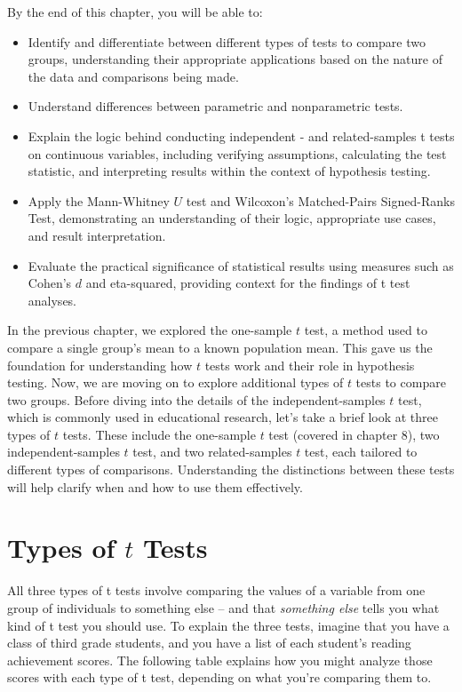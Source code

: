 \documentclass[
  letterpaper,
  DIV=11,
  numbers=noendperiod]{scrreprt}
\begin{document}

By the end of this chapter, you will be able to:

\begin{itemize}
\item
  Identify and differentiate between different types of tests to compare
  two groups, understanding their appropriate applications based on the
  nature of the data and comparisons being made.
\item
  Understand differences between parametric and nonparametric tests.
\item
  Explain the logic behind conducting independent - and related-samples
  t tests on continuous variables, including verifying assumptions,
  calculating the test statistic, and interpreting results within the
  context of hypothesis testing.
\item
  Apply the Mann-Whitney \(U\) test and Wilcoxon's Matched-Pairs
  Signed-Ranks Test, demonstrating an understanding of their logic,
  appropriate use cases, and result interpretation.
\item
  Evaluate the practical significance of statistical results using
  measures such as Cohen's \(d\) and eta-squared, providing context for
  the findings of t test analyses.
\end{itemize}

In the previous chapter, we explored the one-sample \(t\) test, a method
used to compare a single group's mean to a known population mean. This
gave us the foundation for understanding how \(t\) tests work and their
role in hypothesis testing. Now, we are moving on to explore additional
types of \(t\) tests to compare two groups. Before diving into the
details of the independent-samples \(t\) test, which is commonly used in
educational research, let's take a brief look at three types of \(t\)
tests. These include the one-sample \(t\) test (covered in chapter 8),
two independent-samples \(t\) test, and two related-samples \(t\) test,
each tailored to different types of comparisons. Understanding the
distinctions between these tests will help clarify when and how to use
them effectively.

\section{\texorpdfstring{Types of \(t\)
Tests}{Types of t Tests}}\label{types-of-t-tests}

All three types of t tests involve comparing the values of a variable
from one group of individuals to something else -- and that
\emph{something else} tells you what kind of t test you should use. To
explain the three tests, imagine that you have a class of third grade
students, and you have a list of each student's reading achievement
scores. The following table explains how you might analyze those scores
with each type of t test, depending on what you're comparing them to.
\end{document}
